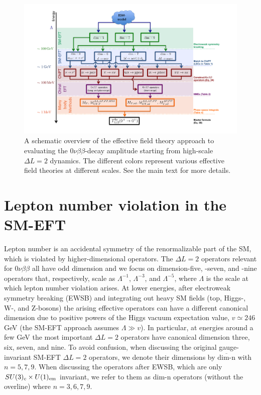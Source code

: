 \documentclass[letterpaper,11pt]{article}
\newcommand{\textoverline}[1]{$\overline{\mbox{#1}}$}
\begin{document}
\begin{figure}
\begin{center}
\includegraphics[trim= {2.8cm 1.8cm 3.6cm 1.2cm}, clip, width=\textwidth]{landscapethingy.pdf}
\end{center}
\caption{A schematic overview of the effective field theory approach to evaluating 
 the $0\nu \beta \beta$-decay amplitude starting from high-scale  $\Delta L = 2$ dynamics. The different colors represent various effective field theories at different scales. See the main text for more details.   
 }
\label{landscape}
\end{figure}


\section{Lepton number violation in the SM-EFT}\label{sec:2}
Lepton number is an accidental symmetry of the renormalizable part of the SM, which is violated by higher-dimensional operators. The $\Delta L=2$ operators relevant for $0\nu\beta\beta$ all have odd dimension \cite{Kobach:2016ami} and we focus on dimension-five, -seven, and -nine operators that, respectively, scale as $\Lambda^{-1}$, $\Lambda^{-3}$, and $\Lambda^{-5}$, where $\Lambda$ is the scale at which lepton number violation arises. At lower energies, after electroweak symmetry breaking (EWSB) and integrating out heavy SM fields (top, Higgs-, W-, and Z-bosons) the arising effective operators can have a different canonical dimension due to positive powers of  the Higgs vacuum expectation value, $v\simeq 246$ GeV (the SM-EFT approach assumes $\Lambda \gg v$). In particular, at energies around a few GeV the most important $\Delta L=2$ operators have canonical dimension three, six, seven, and nine. 
To avoid confusion, when discussing the original gauge-invariant SM-EFT $\Delta L=2$ operators, we denote their dimensions by \textoverline{dim-n}  with $n=5,7,9$. When discussing the operators after EWSB, which are only $SU(3)_c\times U(1)_{\rm em}$ invariant, we refer to them as dim-n operators (without the overline) where $n=3,6,7,9$. 
\end{document}
